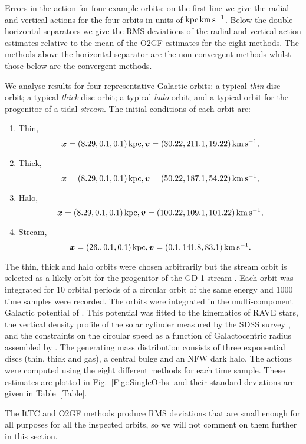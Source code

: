 \documentclass[useAMS,usenatbib,fleqn,a4paper]{mn2e}
\def\kpc{\,{\rm kpc}}
\def\kms{\,{\rm km\,s^{-1}}}
\newcommand{\bs}[1]{\bmath{#1}}
\begin{document}
\begin{table*}
\caption{Errors in the action for four example orbits: on the first line we give the
radial and vertical actions for the four orbits in units of $\!\kpc\kms$. Below
the double horizontal separators we give the RMS deviations of the
radial and vertical action estimates relative to the mean of the O2GF estimates for the eight methods. The methods above
the horizontal separator are the non-convergent methods whilst those below
are the convergent methods.}  \label{Table}
\end{table*}

We
analyse results for four representative Galactic orbits: a typical
\emph{thin} disc orbit; a typical \emph{thick} disc orbit; a typical
\emph{halo} orbit; and a typical orbit for the progenitor of a tidal
\emph{stream}. The initial conditions of each orbit are:
\begin{enumerate}
\item Thin,
$$\bs{x} = (8.29,0.1,0.1)\kpc, \bs{v}=(30.22,211.1,19.22)\kms,$$
\item Thick, $$\bs{x} = (8.29,0.1,0.1)\kpc, \bs{v}=(50.22,187.1,54.22)\kms,$$
\item Halo, $$\bs{x} = (8.29,0.1,0.1)\kpc, \bs{v}=(100.22,109.1,101.22)\kms,$$
\item Stream, $$\bs{x} = (26.,0.1,0.1)\kpc, \bs{v}=(0.1,141.8,83.1)\kms.$$
\end{enumerate}
The thin, thick and halo orbits were chosen arbitrarily but the stream orbit
is selected as a likely orbit for the progenitor of the GD-1 stream
\citep{Koposov2010,SandersBinney2013b}. Each orbit was integrated for $10$
orbital periods of a circular orbit of the same energy and $1000$ time
samples were recorded.  The orbits were integrated in the multi-component
Galactic potential of \cite{Piffl2014}. This potential was fitted to the
kinematics of RAVE stars, the vertical density profile of the solar cylinder
measured by the SDSS survey \citep{Juric2008}, and the constraints on the
circular speed as a function of Galactocentric radius assembled by
\cite{McMillan2011}.  The generating mass distribution consists of three
exponential discs (thin, thick and gas), a central bulge and an NFW dark
halo. The actions were computed using the eight different methods for each
time sample.  These estimates are plotted in Fig.~\ref{Fig::SingleOrbs} and
their standard deviations are given in Table~\ref{Table}.

The ItTC and O2GF methods produce RMS deviations
that are small enough for all purposes for all the inspected orbits, so we
will not comment on them further in this section.
\end{document}
